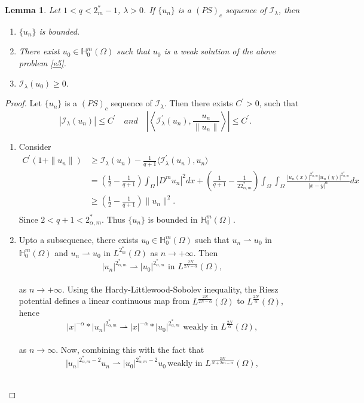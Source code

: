 \documentclass[reqno]{amsart}
\newtheorem{lemma}[theorem]{Lemma}
\newcommand{\la} {\lambda}
\newcommand{\Om}{\Omega}
\newcommand{\weak}{\rightharpoonup}
\newcommand{\al} {\alpha}
\newcommand{\mb} {\mathbb}
\newcommand{\mc} {\mathcal}
\numberwithin{theorem}{section} \numberwithin{equation}{section}
\begin{document}
\begin{lemma}\label{l2}
Let $1<q<2^*_{m}-1$, $\la>0$. If $\{u_n\}$ is a $(PS)_c$ sequence of $\mc{I_\la}$, then
\begin{enumerate}
    \item $\{u_n\}$ is bounded.
    \item There exist $u_0\in \mb{H}^m_0(\Om)$  such that $u_0$  is a weak solution of the above problem \eqref{e5}.
    \item $\mc{I}_\la(u_0)\geq 0.$
\end{enumerate}\end{lemma}
\begin{proof} Let $\{u_n\}$ is a $(PS)_c$ sequence of $\mc{I_\la}$. Then
 there exists $C^{\prime} >0$, such that\[\left|\mc{I_\la}(u_n)\right|\leq C^{\prime}\quad and \quad \left|\left\langle \mc I_\la^{\prime}( u_n),\frac{u_n }{\| u_n\|}\right\rangle\right|\leq C^{\prime}.\]
\begin{enumerate}
 \item  Consider
\begin{align*}
C^{\prime}(1+\|u_n\|)& \geq  \mc{I_\la}(u_n)- \frac{1}{q+1}\langle \mc I_\la^{\prime}(u_n),{u_n }\rangle\\
&=\left({\frac{1}{2}}-{\frac{1}{q+1}}\right)\int_{\Om}|D^{m}u_n|^2 dx + \left({\frac{1}{q+1}}-\frac{1}{22^*_{\al, m}}\right)\int_{\Om}\int_{\Om} \frac{|u_n(x)|^{2_{\al, m}^{*}}|u_n(y)|^{2_{\al,m}^{*}}}{|x-y|^{\al}} dx \\ 
&\geq \left({\frac{1}{2}}-{\frac{1}{q+1}}\right)\|u_n\|^2.\\
\end{align*}
Since $2<q+1<{2^*_{\al, m}}$. Thus $\{u_n\}$ is bounded in $\mb{H}^m_0(\Om)$.\\
\item Upto a subsequence, there exists $u_0\in\mb{H}_0^{m}(\Om)$ such that $u_n \weak u_0$ in $\mb{H}_0^{m}(\Om)$ and $u_n \weak u_0$ in $L^{2^*_m}(\Om)$ as $n\to+\infty$. Then
\[|u_n|^{2_{\al, m}^{*}}\weak|u_0|^{2_{\al, m}^{*}} \text{ in }   L^\frac{2N}{2N-\al}(\Om),\]\\
as $n\to+\infty$. Using the Hardy-Littlewood-Sobolev inequality, the Riesz potential defines a linear continuous map from $L^\frac{2N}{2N-\al}(\Om)$ to $L^\frac{2N}{\al}(\Om)$, hence
\[|x|^{-\al}*|u_n|^{2_{\al, m}^{*}} \weak|x|^{-\al}*|u_0|^{2_{\al, m}^{*}}\text{  weakly in }  L^\frac{2N}{\al}(\Om),\]\\
as $n\to\infty$. Now, combining this with the fact that
\[|u_n|^{2_{\al, m}^{*}-2}u_n\weak|u_0|^{2_{\al, m}^{*}-2}u_0\, \text{weakly in } L^\frac{2N}{N+2m-\al}(\Om),\]\\

\end{enumerate}
\end{proof}
\end{document}
